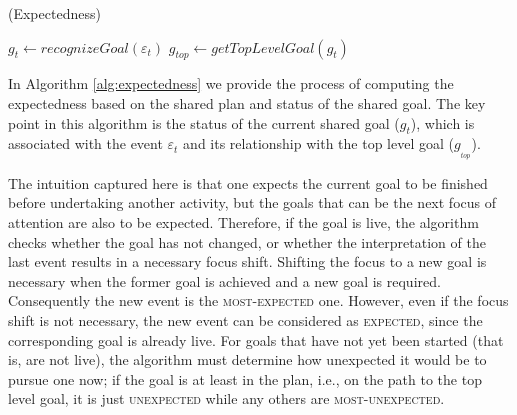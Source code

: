 \begin{algorithm}[t]
	\caption{(Expectedness)}
	\label{alg:expectedness}
	\begin{algorithmic}[1]
			\Statex
			\State $\mathit{g}_{t} \gets \textit{recognizeGoal}{(\varepsilon_t)}$
			\State $\mathit{g}_{top} \gets \textit{getTopLevelGoal}{(\mathit{g}_{t})}$
			\Statex
				\State {}
				\Else
					\State {}
				\EndIf
			\Else
					\State {}
				\Else
					\State {}
				\EndIf
			\EndIf
		\EndFunction
	\end{algorithmic}
\end{algorithm}

In Algorithm \ref{alg:expectedness} we provide the process of computing the
expectedness based on the shared plan and status of the shared goal. The key
point in this algorithm is the status of the current shared goal
($\mathit{g}_{t}$), which is associated with the event $\varepsilon_t$ and its
relationship with the top level goal ($\mathit{g}_{_{top}}$).

The intuition captured here is that one expects the current goal to be finished
before undertaking another activity, but the goals that can be the next focus of
attention are also to be expected. Therefore, if the goal is live, the algorithm
checks whether the goal has not changed, or whether the interpretation of the
last event results in a necessary focus shift. Shifting the focus to a new goal
is necessary when the former goal is achieved and a new goal is required.
Consequently the new event is the \textsc{most-expected} one. However, even if
the focus shift is not necessary, the new event can be considered as
\textsc{expected}, since the corresponding goal is already live. For goals that
have not yet been started (that is, are not live), the algorithm must determine
how unexpected it would be to pursue one now; if the goal is at least in the
plan, i.e., on the path to the top level goal, it is just \textsc{unexpected}
while any others are \textsc{most-unexpected}.

